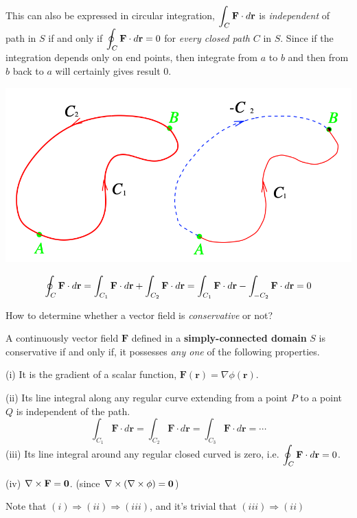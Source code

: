 \documentclass[11pt, a4paper]{MATH2023}
\newcommand{\rr}{{\bf r}}
\newcommand{\FF}{{\bf F}}
\begin{document}
\begin{spacing}{1.3}
    \vspace{0.5in}
    This can also be expressed in circular integration, $\disp \int_C \FF\cdot d\rr$ is {\it independent} of 
    path in $S$ if and only if $\disp \oint_C \FF\cdot d\rr =0$ for {\it every closed path} $C$ in $S$.
    Since if the integration depends only on end points, then integrate from $a$ to $b$ and then from $b$
    back to $a$ will certainly gives result 0.
    \begin{center}
        \includegraphics[scale=0.4]{images/Ch15-circular-integ.png}
    \end{center}
    $$\oint_{C} \FF \cdot d \rr =\int_{C_{1}} \FF \cdot d \rr+\int_{C_{2}} \mathbf{F} \cdot d \mathbf{r} 
    =\int_{C_{1}} \mathbf{F} \cdot d \mathbf{r}-\int_{-C_{2}} \mathbf{F} \cdot d \mathbf{r}=0 $$

    \newpage
    {\blue How to determine whether a vector field is {\it conservative} or not?}

    A continuously vector field $\mathbf{F}$ defined in a {\bf simply-connected domain} $S$ is conservative 
    if and only if, it possesses {\it any one} of the following properties.
    
    (i) It is the gradient of a scalar function, $\mathbf{F}(\mathbf{r})=\nabla \phi(\mathbf{r})$.
    
    (ii) Its line integral along any regular curve extending from a point $P$ to a point $Q$ is independent of the path.
    $$
    \int_{C_{1}} \mathbf{F} \cdot d \mathbf{r}=\int_{C_{2}} \mathbf{F} \cdot d \mathbf{r}=\int_{C_{3}} \mathbf{F} \cdot d \mathbf{r}=\cdots
    $$
    (iii) Its line integral around any regular closed curved is zero, i.e. $\displaystyle \oint_{C} \mathbf{F} \cdot d \mathbf{r}=0$.

    (iv) $\nabla \times \FF ={\bf 0}$. (since $\nabla \times (\nabla\times \phi)={\bf 0}$)

    {\blue Note that $(i)\Rightarrow (ii)\Rightarrow (iii)$, and it's trivial that $(iii)\Rightarrow (ii)$}


\end{spacing}
\end{document}
